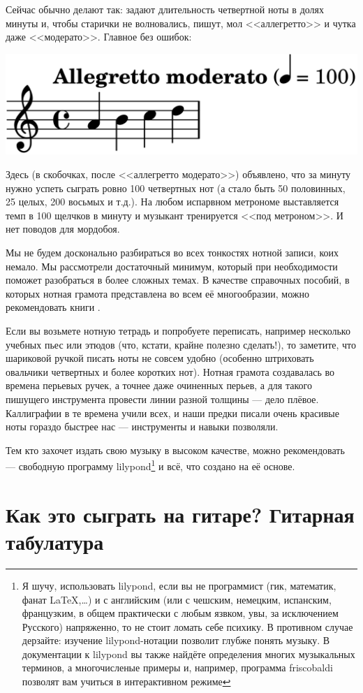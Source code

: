 Сейчас обычно делают так: задают длительность четвертной ноты в долях минуты и, чтобы старички не волновались, пишут, мол <<аллегретто>> и чутка даже <<модерато>>. Главное без ошибок:
\begin{center}
    \includegraphics{fig/notes/tempo}
\end{center}

Здесь (в скобочках, после <<аллегретто модерато>>) объявлено, что за минуту нужно успеть сыграть ровно 100 четвертных нот (а стало быть 50 половинных, 25 целых, 200 восьмых и т.д.). На любом испарвном метрономе выставляется темп в 100 щелчков в минуту и музыкант тренируется <<под метроном>>. И нет поводов для мордобоя. 

Мы не будем досконально разбираться во всех тонкостях нотной записи, коих немало. Мы рассмотрели достаточный минимум, который при необходимости поможет разобраться в более сложных темах. В качестве справочных пособий, в которых нотная грамота представлена во всем её многообразии, можно рекомендовать книги \cite{bib:alekseev:MusicTheory,bib:vahromeev:Theory}.

Если вы возьмете нотную тетрадь и попробуете переписать, например несколько учебных пьес или этюдов (что, кстати, крайне полезно сделать!), то заметите, что шариковой ручкой писать ноты не совсем удобно (особенно штриховать овальчики четвертных и более коротких нот). Нотная грамота создавалась во времена перьевых ручек, а точнее даже очиненных перьев, а для такого пишущего инструмента провести линии разной толщины --- дело плёвое. Каллиграфии в те времена учили всех, и наши предки писали очень красивые ноты гораздо быстрее нас --- инструменты и навыки позволяли.

Тем кто захочет издать свою музыку в высоком качестве, можно рекомендовать \cite{url:lilypond} --- свободную программу lilypond\footnote{Я шучу, использовать lilypond, если вы не программист (гик, математик, фанат \LaTeX,\ldots) и с английским (или с чешским, немецким, испанским, французким, в общем практически с любым язвком, увы, за исключением Русского) напряженно, то не стоит ломать себе психику. В противном случае дерзайте: изучение lilypond-нотации позволит глубже понять музыку. В документации к lilypond вы также найдёте определения многих музыкальных терминов, а многочисленые примеры и, например, программа friscobaldi позволят вам учиться в интерактивном режиме} и всё, что создано на её основе.


\section{Как это сыграть на гитаре? Гитарная табулатура}



